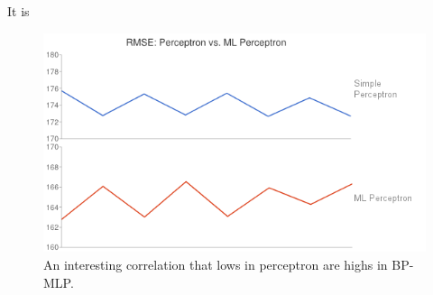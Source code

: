 It is 
\begin{figure}[center]
	\centering
	\includegraphics[width=12cm]{images/chart10.png}
	\caption{An interesting correlation that lows in perceptron are highs in BP-MLP.}
	\label{fig:perceptron_vs_bp}
\end{figure}
\clearpage


%





